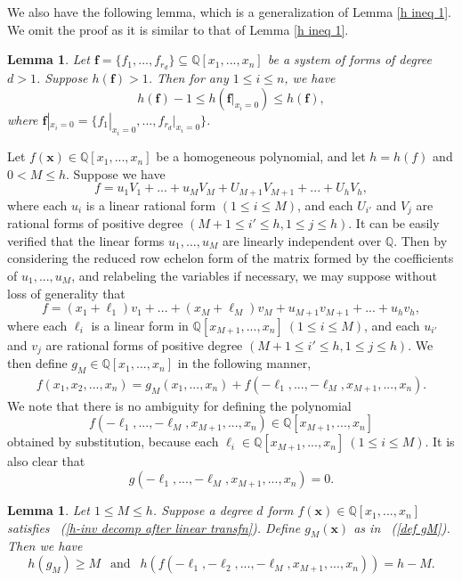 \documentclass[12pt]{amsart}
\newtheorem{lem}[thm]{Lemma}
\theoremstyle{definition}
\theoremstyle{remark}
\numberwithin{equation}{section}
\begin{document}
We also have the following lemma, which is a generalization of Lemma \ref{h ineq 1}.
We omit the proof as it is similar to that of Lemma \ref{h ineq 1}.
\begin{lem}
\label{h ineq 1'}
Let $\mathbf{f} = \{f_1, ..., f_{r_d} \} \subseteq \mathbb{Q}[x_1, ..., x_n]$ be a system of forms of degree $d>1$.
Suppose $h(\mathbf{f})>1$. Then for any  $1 \leq i \leq n$, we have
$$
h( \mathbf{f} ) -1   \leq h( \mathbf{f} |_{x_i=0} ) \leq h( \mathbf{f} ),
$$
where $\mathbf{f} |_{x_i=0} = \{ f_1|_{x_i=0}, ... , f_{r_d}|_{x_i = 0} \}$.
\end{lem}

Let $f(\mathbf{x}) \in \mathbb{Q}[x_1, ..., x_n]$ be a homogeneous polynomial, and let $h = h(f)$ and $0 < M  \leq h$. Suppose we have
$$
f = u_1 V_1 + ... + u_{M} V_{M} + U_{M+1} V_{M+1} + ... + U_h V_h,
$$
where each $u_i$ is a linear rational form $(1 \leq i \leq M)$, and each $U_{i'}$ and $V_j$
are rational forms of positive degree $(M+1 \leq i' \leq h, 1 \leq j \leq h)$. It can be easily
verified that the linear forms $u_1, ..., u_M$ are linearly independent over $\mathbb{Q}$.
Then by considering the reduced row echelon form of the matrix formed by the coefficients of $u_1, ..., u_M$, and relabeling the
variables if necessary, we may suppose without loss of generality that
\begin{equation}
\label{h-inv decomp after linear transfn}
f = (x_1 + \ell_1) v_1 + ... + (x_M + \ell_M) v_M + u_{M+1} v_{M+1} + ... + u_h v_h,
\end{equation}
where each $\ell_i$ is a linear form in $\mathbb{Q}[x_{M+1}, ..., x_n] \ (1 \leq i \leq M)$, and each $u_{i'}$ and $v_j$
are rational forms of positive degree $(M+1 \leq i' \leq h, 1 \leq j \leq h)$.
We then define $g_M \in \mathbb{Q}[x_1, ..., x_n]$ in the following manner,
\begin{eqnarray}
\label{def gM}
f ( x_1, x_2, ..., x_n ) 
= g_M (x_1, ..., x_n) + f(-\ell_1, ...,  - \ell_M, x_{M+1}, ..., x_n).
\end{eqnarray}
We note that there is no ambiguity for defining the polynomial
$$
f(-\ell_1, ..., -\ell_M, x_{M+1}, ..., x_n) \in \mathbb{Q}[x_{M+1}, ..., x_n]
$$
obtained by substitution, because each $\ell_i \in  \mathbb{Q}[x_{M+1}, ..., x_n] \ (1 \leq i \leq M)$.
It is also clear that
\begin{equation}
\label{gM is 0}
g(-\ell_1, ...,  - \ell_M, x_{M+1}, ..., x_n) = 0.
\end{equation}

\begin{lem}
\label{h ineq2}
Let $1 \leq M \leq h$. Suppose a degree $d$ form $f(\mathbf{x}) \in \mathbb{Q}[x_1, ..., x_n]$ satisfies
~(\ref{h-inv decomp after linear transfn}). Define $g_M(\mathbf{x})$ as in ~(\ref{def gM}). Then we have
$$
h(g_M) \geq M   \ \ \text{  and } \ \  h( f( -\ell_1, - \ell_2, ... , - \ell_M, x_{M+1}, ..., x_n ) ) = h-M.
$$
\end{lem}
\end{document}
